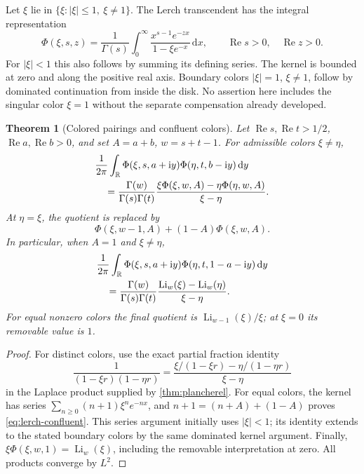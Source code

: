 \documentclass[11pt,a4paper]{article}
\newtheorem{theorem}{Theorem}[section]
\theoremstyle{definition}
\numberwithin{equation}{section}
\newcommand{\R}{\mathbb R}
\newcommand{\Rea}{\operatorname{Re}}
\newcommand{\Li}{\operatorname{Li}}
\newcommand{\dd}{\,\mathrm d}
\newcommand{\ii}{\mathrm i}
\begin{document}
Let $\xi$ lie in $\{\xi:|\xi|\le1,\ \xi\ne1\}$. The Lerch transcendent
has the integral representation \cite{dlmf-lerch}
\begin{equation}\label{eq:lerch-laplace}
 \Phi(\xi,s,z)=\frac1{\Gamma(s)}\int_0^\infty
           \frac{x^{s-1}e^{-zx}}{1-\xi e^{-x}}\dd x,
 \qquad\Rea s>0,\quad\Rea z>0.
\end{equation}
For $|\xi|<1$ this also follows by summing its defining series.
The kernel is bounded at zero and along the positive real axis. Boundary
colors $|\xi|=1$, $\xi\ne1$, follow by dominated continuation from inside
the disk. No assertion here includes the singular color $\xi=1$ without
the separate compensation already developed.

\begin{theorem}[Colored pairings and confluent colors]\label{thm:lerch}
Let $\Rea s,\Rea t>1/2$, $\Rea a,\Rea b>0$, and set
$A=a+b$, $w=s+t-1$. For admissible colors $\xi\ne\eta$,
\begin{align}
 &\frac1{2\pi}\int_{\R}\Phi(\xi,s,a+\ii y)
                             \Phi(\eta,t,b-\ii y)\dd y\notag\\
 &\quad=\frac{\Gamma(w)}{\Gamma(s)\Gamma(t)}
           \frac{\xi\Phi(\xi,w,A)-\eta\Phi(\eta,w,A)}{\xi-\eta}.
               \label{eq:lerch-distinct}
\end{align}
At $\eta=\xi$, the quotient is replaced by
\begin{equation}\label{eq:lerch-confluent}
 \Phi(\xi,w-1,A)+(1-A)\Phi(\xi,w,A).
\end{equation}
In particular, when $A=1$ and $\xi\ne\eta$,
\begin{align}
 &\frac1{2\pi}\int_{\R}\Phi(\xi,s,a+\ii y)
                             \Phi(\eta,t,1-a-\ii y)\dd y\notag\\
 &\quad=\frac{\Gamma(w)}{\Gamma(s)\Gamma(t)}
                 \frac{\Li_w(\xi)-\Li_w(\eta)}{\xi-\eta}.
                     \label{eq:polylog-divdiff}
\end{align}
For equal nonzero colors the final quotient is $\Li_{w-1}(\xi)/\xi$;
at $\xi=0$ its removable value is $1$.
\end{theorem}
\begin{proof}
For distinct colors, use the exact partial fraction identity
\[
 \frac1{(1-\xi r)(1-\eta r)}
 =\frac{\xi/(1-\xi r)-\eta/(1-\eta r)}{\xi-\eta}
\]
in the Laplace product supplied by \cref{thm:plancherel}.
For equal colors, the kernel has series
$\sum_{n\ge0}(n+1)\xi^n e^{-nx}$, and
$n+1=(n+A)+(1-A)$ proves \eqref{eq:lerch-confluent}.
This series argument initially uses $|\xi|<1$; its identity extends to
the stated boundary colors by the same dominated kernel argument.
Finally, $\xi\Phi(\xi,w,1)=\Li_w(\xi)$, including the removable
interpretation at zero. All products converge by $L^2$.
\end{proof}
\end{document}
